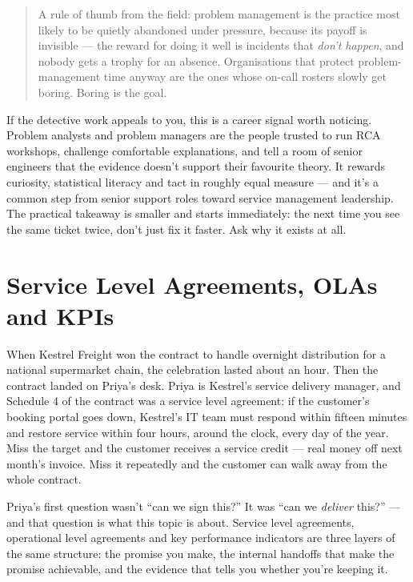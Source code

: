 \begin{quote}\small
A rule of thumb from the field: problem management is the practice most likely to be quietly abandoned under pressure, because its payoff is invisible — the reward for doing it well is incidents that \emph{don't happen}, and nobody gets a trophy for an absence. Organisations that protect problem-management time anyway are the ones whose on-call rosters slowly get boring. Boring is the goal.
\end{quote}


If the detective work appeals to you, this is a career signal worth noticing. Problem analysts and problem managers are the people trusted to run RCA workshops, challenge comfortable explanations, and tell a room of senior engineers that the evidence doesn't support their favourite theory. It rewards curiosity, statistical literacy and tact in roughly equal measure — and it's a common step from senior support roles toward service management leadership. The practical takeaway is smaller and starts immediately: the next time you see the same ticket twice, don't just fix it faster. Ask why it exists at all.

\section{Service Level Agreements, OLAs and KPIs}
When Kestrel Freight won the contract to handle overnight distribution for a national supermarket chain, the celebration lasted about an hour. Then the contract landed on Priya's desk. Priya is Kestrel's service delivery manager, and Schedule 4 of the contract was a service level agreement: if the customer's booking portal goes down, Kestrel's IT team must respond within fifteen minutes and restore service within four hours, around the clock, every day of the year. Miss the target and the customer receives a service credit — real money off next month's invoice. Miss it repeatedly and the customer can walk away from the whole contract.


Priya's first question wasn't ``can we sign this?'' It was ``can we \emph{deliver} this?'' — and that question is what this topic is about. Service level agreements, operational level agreements and key performance indicators are three layers of the same structure: the promise you make, the internal handoffs that make the promise achievable, and the evidence that tells you whether you're keeping it.



